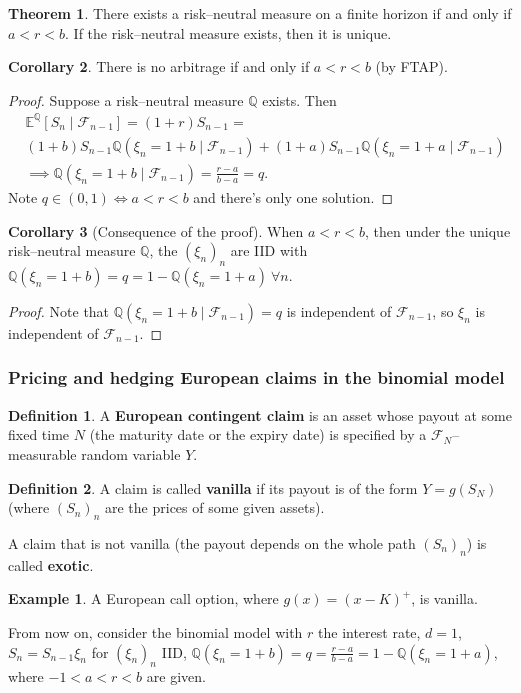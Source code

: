 \documentclass{article}
\theoremstyle{definition}
\newtheorem{theorem}{Theorem}[section]
\newtheorem{cor}[theorem]{Corollary}
\newtheorem{example}{Example}[section]
\newtheorem{defn}{Definition}[section]
\begin{document}
\begin{theorem}
    There exists a risk--neutral measure on a finite horizon if and only if $a<r<b$. If the risk--neutral measure exists, then it is unique.
\end{theorem}
\begin{cor}
    There is no arbitrage if and only if $a<r<b$ (by FTAP).
\end{cor}
\begin{proof}
    Suppose a risk--neutral measure $\mathbb{Q}$ exists. Then 
    \begin{align*}
        &\mathbb{E}^{\mathbb{Q}}[S_n \mid \mathcal{F}_{n-1}] = (1+r)S_{n-1} = \\
        &(1+b)S_{n-1}\mathbb{Q}(\xi_n=1+b \mid \mathcal{F}_{n-1}) + (1+a)S_{n-1}\mathbb{Q}(\xi_n=1+a \mid \mathcal{F}_{n-1}) \\
        &\implies \mathbb{Q}(\xi_n = 1+b \mid \mathcal{F}_{n-1}) = \frac{r-a}{b-a}=q.
    \end{align*}
    Note $q \in (0,1) \iff a<r<b$ and there's only one solution.
\end{proof}
\begin{cor}[Consequence of the proof]
    When $a<r<b$, then under the unique risk--neutral measure $\mathbb{Q}$, the $(\xi_n)_n$ are IID with $\mathbb{Q}(\xi_n=1+b)=q = 1 - \mathbb{Q}(\xi_n=1+a) ~\forall n$.
\end{cor}
\begin{proof}
    Note that $\mathbb{Q}(\xi_n = 1+b \mid \mathcal{F}_{n-1})=q$ is independent of $\mathcal{F}_{n-1}$, so $\xi_n$ is independent of $\mathcal{F}_{n-1}$.
\end{proof}


\subsubsection*{Pricing and hedging European claims in the binomial model}
\begin{defn}
    A \textbf{European contingent claim} is an asset whose payout at some fixed time $N$ (the maturity date or the expiry date) is specified by a $\mathcal{F}_N$--measurable random variable $Y$.
\end{defn}
\begin{defn}
    A claim is called \textbf{vanilla} if its payout is of the form $Y=g(S_N)$ (where $(S_n)_n$ are the prices of some given assets).
    \vspace{1mm}
    
    A claim that is not vanilla (the payout depends on the whole path $(S_n)_n$) is called \textbf{exotic}. 
\end{defn}
\begin{example}
    A European call option, where $g(x)=(x-K)^+$, is vanilla.
\end{example}
From now on, consider the binomial model with $r$ the interest rate, $d=1$, $S_n = S_{n-1}\xi_{n}$ for $(\xi_n)_n$ IID, $\mathbb{Q}(\xi_n=1+b)=q=\frac{r-a}{b-a}=1-\mathbb{Q}(\xi_n=1+a)$, where $-1<a<r<b$ are given.
\vspace{1mm}
\end{document}
